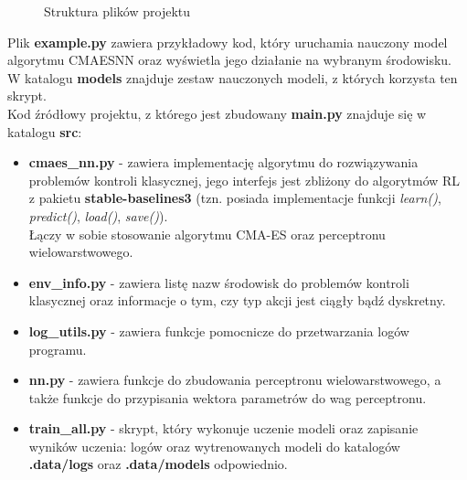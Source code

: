 \documentclass[12pt,a4paper]{article}
\begin{document}
\begin{figure}[!ht]
  \caption{Struktura plików projektu}
  \label{fig:dirtree}
\end{figure}

Plik \textbf{example.py} zawiera przykładowy kod, który uruchamia nauczony
model algorytmu CMAESNN oraz wyświetla jego działanie na wybranym środowisku.
W katalogu \textbf{models} znajduje zestaw nauczonych modeli, z których
korzysta ten skrypt.\\

Kod źródłowy projektu, z którego jest zbudowany \textbf{main.py} znajduje się
w katalogu \textbf{src}:
\begin{itemize}
  \item \textbf{cmaes\_nn.py} - zawiera implementację algorytmu do rozwiązywania
        problemów kontroli klasycznej, jego interfejs jest zbliżony
        do algorytmów RL z pakietu \textbf{stable-baselines3}
        (tzn. posiada implementacje funkcji \emph{learn()}, \emph{predict()},
        \emph{load()}, \emph{save()}). \\
        Łączy w sobie stosowanie algorytmu CMA-ES oraz perceptronu wielowarstwowego.

  \item \textbf{env\_info.py} - zawiera listę nazw środowisk do problemów kontroli
        klasycznej oraz informacje o tym, czy typ akcji jest ciągły bądź dyskretny.

  \item \textbf{log\_utils.py} - zawiera funkcje pomocnicze do przetwarzania
        logów programu.

  \item \textbf{nn.py} - zawiera funkcje do zbudowania perceptronu
        wielowarstwowego, a także funkcje do przypisania wektora parametrów
        do wag perceptronu.
  \item \textbf{train\_all.py} - skrypt, który wykonuje uczenie modeli
        oraz zapisanie wyników uczenia: logów oraz wytrenowanych modeli do
        katalogów \textbf{.data/logs} oraz \textbf{.data/models} odpowiednio.
\end{itemize}
\end{document}
